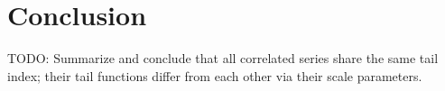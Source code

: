 \documentclass{article}
\newcommand{\1}[1]{
  \mathbf{1}_{\{#1\}}
}
\begin{document}
















\section{Conclusion}
TODO: Summarize and conclude that all correlated series share the same
tail index; their tail functions differ from each other via their
scale parameters.



\end{document}
